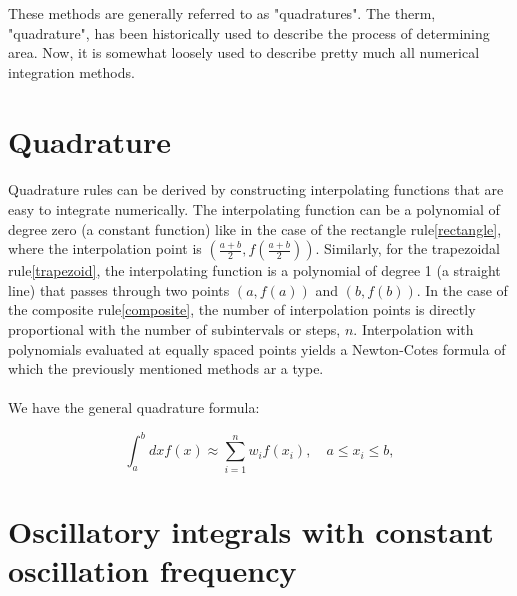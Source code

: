 These methods are generally referred to as "quadratures". The therm, "quadrature", has been historically used to describe the process of determining area. Now, it is somewhat loosely used to describe pretty much all numerical integration methods.

\section{Quadrature}

\paragraph{} Quadrature rules can be derived by constructing interpolating functions that are easy to integrate numerically.
The interpolating function can be a polynomial of degree zero (a constant function) like in the case of the rectangle rule\eqref{rectangle},
where the interpolation point is $\left(\frac{a+b}{2},f\left(\frac{a+b}{2}\right)\right)$. Similarly, for the trapezoidal rule\eqref{trapezoid}, the interpolating function is a polynomial of degree 1 (a straight line) that passes through two points $(a,f(a))$ and $(b,f(b))$. 
In the case of the composite rule\eqref{composite}, the number of interpolation points is directly proportional with the number of subintervals or steps, $n$. Interpolation with polynomials evaluated at equally spaced points yields a Newton-Cotes formula of which the previously mentioned methods ar a type.

\paragraph{} We have the general quadrature formula: 


\begin{equation}
    \int_a^b dx f(x)  \approx \sum_{i=1}^n w_if(x_i), \quad a \leq x_i \leq b,\label{quadrature}
\end{equation}
    


\section{Oscillatory integrals with constant oscillation frequency}


